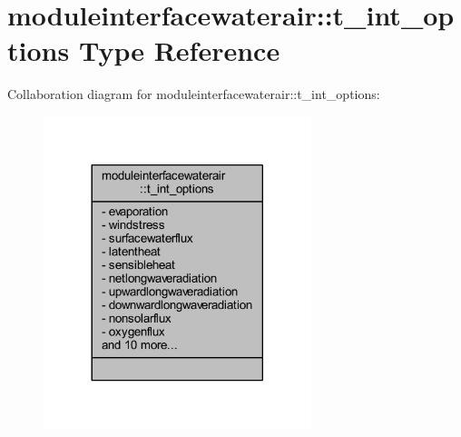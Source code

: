 \hypertarget{structmoduleinterfacewaterair_1_1t__int__options}{}\section{moduleinterfacewaterair\+:\+:t\+\_\+int\+\_\+options Type Reference}
\label{structmoduleinterfacewaterair_1_1t__int__options}


Collaboration diagram for moduleinterfacewaterair\+:\+:t\+\_\+int\+\_\+options\+:\nopagebreak
\begin{figure}[H]
\begin{center}
\leavevmode
\includegraphics[width=221pt]{structmoduleinterfacewaterair_1_1t__int__options__coll__graph}
\end{center}
\end{figure}
